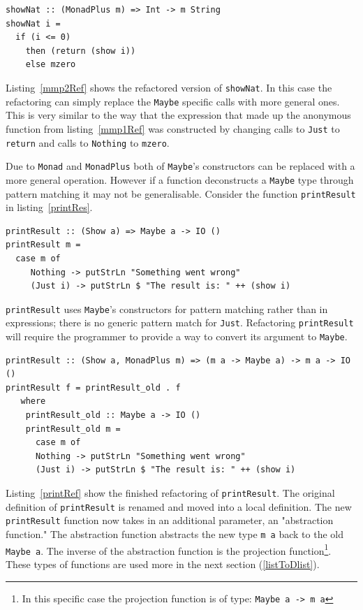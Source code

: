 \begin{lstlisting}[caption={\texttt{showNat} refactored}, label=mmp2Ref]
showNat :: (MonadPlus m) => Int -> m String
showNat i =
  if (i <= 0)
    then (return (show i))
    else mzero
\end{lstlisting}
 
Listing~\ref{mmp2Ref} shows the refactored version of \texttt{showNat}. In this case the refactoring can simply replace the \texttt{Maybe} specific calls with more general ones. This is very similar to the way that the expression that made up the anonymous function from listing~\ref{mmp1Ref} was constructed by changing calls to \texttt{Just} to \texttt{return} and calls to \texttt{Nothing} to \texttt{mzero}. 

Due to \texttt{Monad} and \texttt{MonadPlus} both of \texttt{Maybe}'s constructors can be replaced with a more general operation. However if a function deconstructs a \texttt{Maybe} type through pattern matching it may not be generalisable. Consider the function \texttt{printResult} in listing~\ref{printRes}.

\begin{lstlisting}[caption={\texttt{printResult}},label=printRes]
printResult :: (Show a) => Maybe a -> IO ()
printResult m =
  case m of
     Nothing -> putStrLn "Something went wrong"
     (Just i) -> putStrLn $ "The result is: " ++ (show i)
\end{lstlisting}

\texttt{printResult} uses \texttt{Maybe}'s constructors for pattern matching rather than in expressions; there is no generic pattern match for \texttt{Just}. Refactoring \texttt{printResult} will require the programmer to provide a way to convert its argument to \texttt{Maybe}.

\begin{lstlisting}[caption={Refactored \texttt{printResult}},label=printRef]
printResult :: (Show a, MonadPlus m) => (m a -> Maybe a) -> m a -> IO ()
printResult f = printResult_old . f
   where
	printResult_old :: Maybe a -> IO ()
   	printResult_old m =
   	  case m of
  	  Nothing -> putStrLn "Something went wrong"
  	  (Just i) -> putStrLn $ "The result is: " ++ (show i)
\end{lstlisting}
 
Listing~\ref{printRef} show the finished refactoring of \texttt{printResult}. The original definition of \texttt{printResult} is renamed and moved into a local definition. The new \texttt{printResult} function now takes in an additional parameter, an "abstraction function." The abstraction function abstracts the new type \texttt{m a} back to the old \texttt{Maybe a}. The inverse of the abstraction function is the projection function\footnote{In this specific case the projection function is of type: \texttt{Maybe a -> m a}}. These types of functions are used more in the next section (\ref{listToDlist}).

